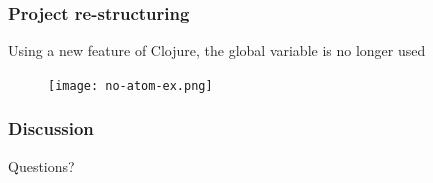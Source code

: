 \documentclass{beamer}
\begin{document}
\begin{frame}
  \frametitle{Project re-structuring}
Using a new feature of Clojure, the global variable is no longer used
\begin{figure}
\texttt{[image: no-atom-ex.png]}
\end{figure}
\end{frame}

\begin{frame}
  \frametitle{Discussion}
Questions?
\end{frame}
\end{document}
